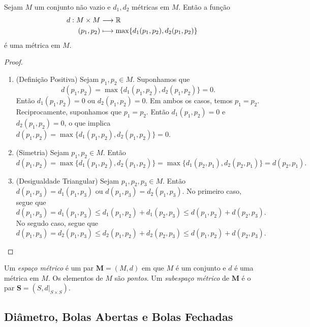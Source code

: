 \begin{prop}
	Sejam $M$ um conjunto não vazio e $d_1,d_2$ métricas em $M$. Então a função
	\begin{align*}
	d: M \times M &\longrightarrow \mathbb{R} \\
	 (p_1,p_2) &\longmapsto \max\{d_1(p_1,p_2),d_2(p_1,p_2)\}
	\end{align*}
é uma métrica em $M$.
\end{prop}
\begin{proof}
	\begin{enumerate}
	\item (Definição Positiva) Sejam $p_1,p_2 \in M$. Suponhamos que
	\begin{equation*}
	d(p_1,p_2)=\max\{d_1(p_1,p_2),d_2(p_1,p_2)\}=0.
	\end{equation*}
Então $d_1(p_1,p_2)=0$ ou $d_2(p_1,p_2)=0$. Em ambos os casos, temos $p_1=p_2$. Reciprocamente, suponhamos que $p_1=p_2$. Então $d_1(p_1,p_2)=0$ e $d_2(p_1,p_2)=0$, o que implica $d(p_1,p_2)=\max\{d_1(p_1,p_2),d_2(p_1,p_2)\}=0$.
	
	\item (Simetria) Sejam $p_1,p_2 \in M$. Então
	\begin{equation*}
	d(p_1,p_2) = \max\{d_1(p_1,p_2),d_2(p_1,p_2)\} = \max\{d_1(p_2,p_1),d_2(p_2,p_1)\} = d(p_2,p_1).
	\end{equation*}
	
	\item (Desigualdade Triangular) Sejam $p_1,p_2,p_3 \in M$. Então $d(p_1,p_3)=d_1(p_1,p_3)$ ou $d(p_1,p_3)=d_2(p_1,p_3)$. No primeiro caso, segue que
	\begin{equation*}
	d(p_1,p_3) = d_1(p_1,p_3) \leq d_1(p_1,p_2) + d_1(p_2,p_3) \leq d(p_1,p_2) + d(p_2,p_3).
	\end{equation*}
	No segudo caso, segue que
	\begin{equation*}
	d(p_1,p_3) = d_2(p_1,p_3) \leq d_2(p_1,p_2) + d_2(p_2,p_3) \leq d(p_1,p_2) + d(p_2,p_3).
	\end{equation*}
	\end{enumerate}
\end{proof}

\begin{defi}
Um \emph{espaço métrico} é um par $\bm M=(M,d)$ em que $M$ é um conjunto e $d$ é uma métrica em $M$. Os elementos de $M$ são \emph{pontos}. Um \emph{subespaço métrico} de $\bm M$ é o par $\bm S=(S,d|_{S \times S})$.
\end{defi}

\subsection{Diâmetro, Bolas Abertas e Bolas Fechadas}

